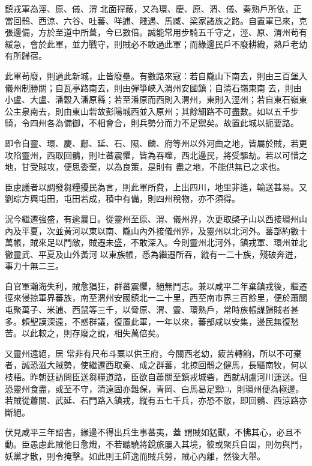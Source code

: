 \begin{pinyinscope}
 鎮戎軍為涇、原、儀、渭
 北面捍蔽，又為環、慶、原、渭、儀、秦熟戶所依，正當回鶻、西涼、六谷、吐蕃、咩逋、賤遇、馬臧、梁家諸族之路。自置軍已來，克張邊備，方於至道中所葺，今已數倍。誠能常用步騎五千守之，涇、原、渭州茍有緩急，會於此軍，並力戰守，則賊必不敢過此軍；而緣邊民戶不廢耕織，熟戶老幼有所歸宿。



 此軍茍廢，則過此新城，止皆廢壘。有數路來寇：若自隴山下南去，則由三百堡入儀州制勝關；自瓦亭路南去，則由彈箏峽入渭州安國鎮；自清石嶺東南
 去，則由小盧、大盧、潘穀入潘原縣；若至潘原而西則入渭州，東則入涇州；若自東石嶺東公主泉南去，則由東山砦故彭陽城西並入原州；其餘細路不可盡數。如以五千步騎，令四州各為備御，不相會合，則兵勢分而力不足禦矣。故置此城以扼要路。



 即令自靈、環、慶、鄜、延、石、隰、麟、府等州以外河曲之地，皆屬於賊，若更攻陷靈州，西取回鶻，則吐蕃震懼，皆為吞噬，西北邊民，將受驅劫。若以可惜之地，甘受賊攻，便思委棄，以為良策，是則有
 盡之地，不能供無已之求也。



 臣慮議者以調發芻糧擾民為言，則此軍所費，上出四川，地里非遙，輸送甚易。又劉琮方興屯田，屯田若成，積中有備，則四州稅物，亦不須得。



 況今繼遷強盛，有逾曩日。從靈州至原、渭、儀州界，次更取棨子山以西接環州山內及平夏，次並黃河以東以南、隴山內外接儀州界，及靈州以北河外。蕃部約數十萬帳，賊來足以鬥敵，賊遷未盛，不敢深入。今則靈州北河外，鎮戎軍、環州並北徹靈武、平夏及山外黃河
 以東族帳，悉為繼遷所吞，縱有一二十族，殘破奔迸，事力十無二三。



 自官軍瀚海失利，賊愈猖狂，群蕃震懼，絕無鬥志。兼以咸平二年棄鎮戎後，繼遷徑來侵掠軍界蕃族，南至渭州安國鎮北一二十里，西至南市界三百餘里，便於蕭關屯聚萬子、米逋、西鼠等三千，以脅原、渭、靈、環熟戶，常時族帳謀歸賊者甚多。賴聖謨深遠，不惑群議，復置此軍，一年以來，蕃部咸以安集，邊民無復愁苦。以此較之，則存廢之說，相失萬倍矣。



 又靈州遠絕，居
 常非有尺布斗粟以供王府，今關西老幼，疲苦轉餉，所以不可棄者，誠恐滋大賊勢，使繼遷西取秦、成之群蕃，北掠回鶻之健馬，長驅南牧，何以枝梧。昨朝廷訪問臣送芻糧道路，臣欲自蕭關至鎮戎城砦，西就胡盧河川運送。但恐靈州食盡，或至不守，清遠固亦難保，青岡、白馬曷足禦□，則環州便為極邊。若賊從蕭關、武延、石門路入鎮戎，縱有五七千兵，亦恐不敵，即回鶻、西涼路亦斷絕。



 伏見咸平三年詔書，緣邊不得出兵生事蕃夷，蓋
 謂賊如猛獸，不怫其心，必且不動。臣愚慮此賊他日愈熾，不若聽驍將銳旅屢入其境，彼或聚兵自固，則勿與鬥，妖黨才散，則令掩擊。如此則王師逸而賊兵勞，賊心內離，然後大舉。




\end{pinyinscope}
